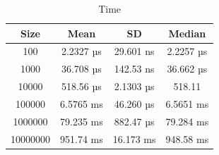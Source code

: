 \documentclass[a4paper,oneside,12pt]{book}
\begin{document}
\begin{table}[H]
    \centering
    \small
    \caption{Time}
    \vspace{1em}
    \begin{tabular}{ | c | c c c | }
        \hline
        Size     & Mean         & SD          & Median \\
        \hline
        100      & 2.2327 µs    & 29.601 ns   & 2.2257 µs \\
        1000     & 36.708 µs    & 142.53 ns   & 36.662 µs \\
        10000    & 518.56 µs    & 2.1303 µs   & 518.11 \\
        100000   & 6.5765 ms    & 46.260 µs   & 6.5651 ms \\
        1000000  & 79.235 ms    & 882.47 µs   & 79.284 ms \\
        10000000 & 951.74 ms    & 16.173 ms   & 948.58 ms \\
        \hline
    \end{tabular}
\end{table}
\clearpage
\end{document}
